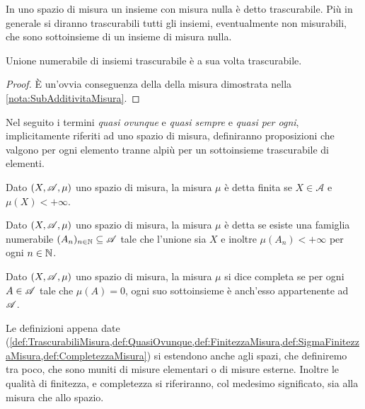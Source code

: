 \begin{definition}\label{def:TrascurabiliMisura}
	In uno spazio di misura un insieme con misura nulla è detto trascurabile.
	Più in generale si diranno trascurabili tutti gli insiemi, eventualmente non misurabili, che sono sottoinsieme di un insieme di misura nulla.
\end{definition}
\begin{remark}\label{nota:UnioneTrascurabili}
	Unione numerabile di insiemi trascurabile è a sua volta trascurabile.
\end{remark}
\begin{proof}
	È un'ovvia conseguenza della \sigsubadd[ità] della misura dimostrata nella \cref{nota:SubAdditivitaMisura}.
\end{proof}

\begin{definition}\label{def:QuasiOvunque}
	Nel seguito i termini \emph{quasi ovunque} e \emph{quasi sempre} e \emph{quasi per ogni}, implicitamente riferiti ad uno spazio di misura, definiranno proposizioni che valgono per ogni elemento tranne alpiù per un sottoinsieme trascurabile di elementi.
\end{definition}


\begin{definition}\label{def:FinitezzaMisura}
	Dato $(X,\mathscr A,\mu)$ uno spazio di misura, la misura $\mu$ è detta finita se $X\in\mathcal{A}$ e $\mu(X)<+\infty$.
\end{definition}

\begin{definition}\label{def:SigmaFinitezzaMisura}
	Dato $(X,\mathscr A,\mu)$ uno spazio di misura, la misura $\mu$ è detta \sigfin{} se esiste una famiglia numerabile $(A_n)_{n\in\mathbb N}\subseteq \mathscr A$ tale che l'unione sia $X$ e inoltre $\mu(A_n)<+\infty$ per ogni $n\in\mathbb N$.
\end{definition}

\begin{definition}\label{def:CompletezzaMisura}
	Dato $(X,\mathscr A,\mu)$ uno spazio di misura, la misura $\mu$ si dice completa se per ogni $A\in\mathscr A$ tale che $\mu(A)=0$, ogni suo sottoinsieme è anch'esso appartenente ad $\mathscr A$.
\end{definition}

\begin{remark}
	Le definizioni appena date (\cref{def:TrascurabiliMisura,def:QuasiOvunque,def:FinitezzaMisura,def:SigmaFinitezzaMisura,def:CompletezzaMisura}) si estendono anche agli spazi, che definiremo tra poco, che sono muniti di misure elementari o di misure esterne. Inoltre le qualità di finitezza, \sigfin[ezza] e completezza si riferiranno, col medesimo significato, sia alla misura che allo spazio. 
\end{remark}

